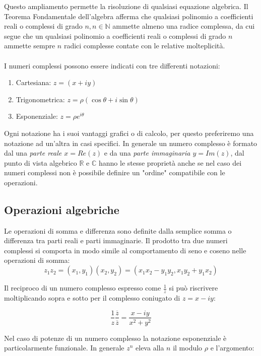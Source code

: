 \documentclass[x11names]{article}
\begin{document}
	Questo ampliamento permette la risoluzione di qualsiasi equazione algebrica. Il Teorema Fondamentale dell'algebra afferma che qualsiasi polinomio a coefficienti reali o complessi di grado $n, n \in \mathbb{N}$ ammette almeno una radice complessa, da cui segue che un qualsiasi polinomio a coefficienti reali o complessi di grado $n$ ammette sempre $n$ radici complesse contate con le relative molteplicità.
	\\ \\
	\noindent
	I numeri complessi possono essere indicati con tre differenti notazioni: 
	\begin{enumerate}
		\item Cartesiana: $z = (x + iy)$
		\item Trigonometrica: $z = \rho(\cos{\theta} + i\sin{\theta})$
		\item Esponenziale: $z = \rho e^{i\theta}$
	\end{enumerate}
	
	\noindent
	Ogni notazione ha i suoi vantaggi grafici o di calcolo, per questo preferiremo una notazione ad un'altra in casi specifici. In generale un numero complesso è formato dal una \textit{parte reale $x = Re(z)$} e da una \textit{parte immaginaria $y=Im(z)$}, dal punto di vista algebrico $\mathbb{R} $ e $ \mathbb{C}$ hanno le stesse proprietà anche se nel caso dei numeri complessi non è possibile definire un "ordine" compatibile con le operazioni.
	
	\subsection{Operazioni algebriche}
	Le operazioni di somma e differenza sono definite dalla semplice somma o differenza tra parti reali e parti immaginarie. Il prodotto tra due numeri complessi si comporta in modo simile al comportamento di seno e coseno nelle operazioni di somma:
	$$
	z_1 z_2 = (x_1, y_1)(x_2, y_2) = (x_1 x_2 - y_1 y_2, x_1 y_2 + y_1 x_2)
	$$
	
	\vspace{0.7em}
	\noindent
	
	
	
	Il reciproco di un numero complesso espresso come $\frac{1}{z}$ si può riscrivere moltiplicando sopra e sotto per il complesso coniugato di $z = x - iy$:
	
	\[
	\frac{1}{z}\frac{\overline{z}}{\overline{z}} = \frac{x-iy}{x^2 + y^2}
	\]
	
	Nel caso di potenze di un numero complesso la notazione esponenziale è particolarmente funzionale. In generale $z^n$ eleva alla $n$ il modulo $\rho$ e l'argomento:
	
\end{document}
